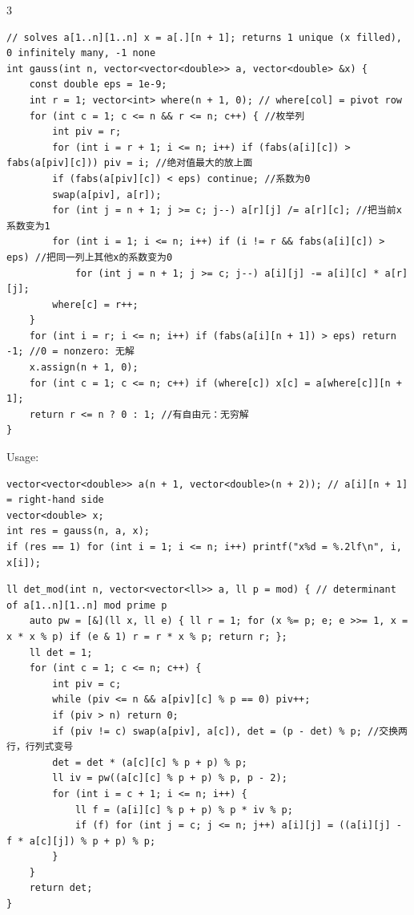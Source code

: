 \documentclass[8pt]{extarticle}
\begin{document}
\begin{multicols*}{3}
\begin{lstlisting}
// solves a[1..n][1..n] x = a[.][n + 1]; returns 1 unique (x filled), 0 infinitely many, -1 none
int gauss(int n, vector<vector<double>> a, vector<double> &x) {
    const double eps = 1e-9;
    int r = 1; vector<int> where(n + 1, 0); // where[col] = pivot row
    for (int c = 1; c <= n && r <= n; c++) { //枚举列
        int piv = r;
        for (int i = r + 1; i <= n; i++) if (fabs(a[i][c]) > fabs(a[piv][c])) piv = i; //绝对值最大的放上面
        if (fabs(a[piv][c]) < eps) continue; //系数为0
        swap(a[piv], a[r]);
        for (int j = n + 1; j >= c; j--) a[r][j] /= a[r][c]; //把当前x系数变为1
        for (int i = 1; i <= n; i++) if (i != r && fabs(a[i][c]) > eps) //把同一列上其他x的系数变为0
            for (int j = n + 1; j >= c; j--) a[i][j] -= a[i][c] * a[r][j];
        where[c] = r++;
    }
    for (int i = r; i <= n; i++) if (fabs(a[i][n + 1]) > eps) return -1; //0 = nonzero: 无解
    x.assign(n + 1, 0);
    for (int c = 1; c <= n; c++) if (where[c]) x[c] = a[where[c]][n + 1];
    return r <= n ? 0 : 1; //有自由元：无穷解
}
\end{lstlisting}

Usage:

\begin{lstlisting}
vector<vector<double>> a(n + 1, vector<double>(n + 2)); // a[i][n + 1] = right-hand side
vector<double> x;
int res = gauss(n, a, x);
if (res == 1) for (int i = 1; i <= n; i++) printf("x%d = %.2lf\n", i, x[i]);
\end{lstlisting}

\begin{lstlisting}
ll det_mod(int n, vector<vector<ll>> a, ll p = mod) { // determinant of a[1..n][1..n] mod prime p
    auto pw = [&](ll x, ll e) { ll r = 1; for (x %= p; e; e >>= 1, x = x * x % p) if (e & 1) r = r * x % p; return r; };
    ll det = 1;
    for (int c = 1; c <= n; c++) {
        int piv = c;
        while (piv <= n && a[piv][c] % p == 0) piv++;
        if (piv > n) return 0;
        if (piv != c) swap(a[piv], a[c]), det = (p - det) % p; //交换两行，行列式变号
        det = det * (a[c][c] % p + p) % p;
        ll iv = pw((a[c][c] % p + p) % p, p - 2);
        for (int i = c + 1; i <= n; i++) {
            ll f = (a[i][c] % p + p) % p * iv % p;
            if (f) for (int j = c; j <= n; j++) a[i][j] = ((a[i][j] - f * a[c][j]) % p + p) % p;
        }
    }
    return det;
}
\end{lstlisting}


\end{multicols*}
\end{document}
